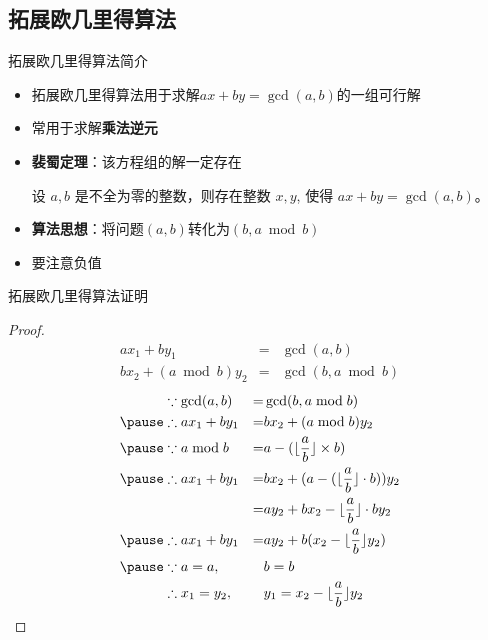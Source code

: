 \documentclass[9pt, c]{beamer}	%
\theoremstyle{plain}
\theoremstyle{definition}
\theoremstyle{remark}
\numberwithin{equation}{section}
\begin{document}
\subsection{拓展欧几里得算法}
\begin{frame}[fragile]{拓展欧几里得算法}{简介}
  \begin{itemize}
    \item 拓展欧几里得算法用于求解$ax+by=\gcd(a,b)$的一组可行解
    \pause
    \item 常用于求解\textbf{乘法逆元}
    \pause 
    \item \textbf{裴蜀定理}：该方程组的解一定存在
    \begin{theorem}[裴蜀定理]
      设 $a,b$ 是不全为零的整数，则存在整数 $x,y$, 使得 $ax+by=\gcd(a,b)$。      
    \end{theorem}
    \pause
    \item \textbf{算法思想}：将问题$(a,b)$转化为$(b, a\bmod b)$
    \pause
    \item 要注意负值
    
  \end{itemize}
\end{frame}

\begin{frame}[fragile]{拓展欧几里得算法}{证明}
  \begin{proof}
  \pause
$$
\begin{aligned}
  &ax_1+by_1&=&\gcd(a,b)&\\
  &bx_2+(a\bmod b)y_2&=&\gcd(b,a\bmod b)&
\end{aligned}
$$
\pause 
$$
\begin{aligned}
  &\because    \gcd(a,b)   &=& \gcd(b,a\bmod b) \\
  \pause
  &\therefore  ax_1+by_1   &=& bx_2+(a\bmod b)y_2\\
  \pause
  &\because    a\bmod b    &=& a-(\lfloor\frac{a}{b}\rfloor\times b)\\
  \pause 
  &\therefore  ax_1+by_1   &=& bx_2+(a-(\lfloor\frac{a}{b}\rfloor\cdot b))y_2\\
  &                      &=& ay_2+bx_2-\lfloor\frac{a}{b}\rfloor\cdot by_2\\
  \pause 
  &\therefore  ax_1+by_1   &=& ay_2+b(x_2-\lfloor\frac{a}{b}\rfloor y_2)\\
  \pause
  &\because    a=a,&\;&b=b  \\
  &\therefore  x_1=y_2,&\;&y_1=x_2-\lfloor\frac{a}{b}\rfloor y_2\\
\end{aligned}
$$
  \end{proof}
\end{frame}
\end{document}
